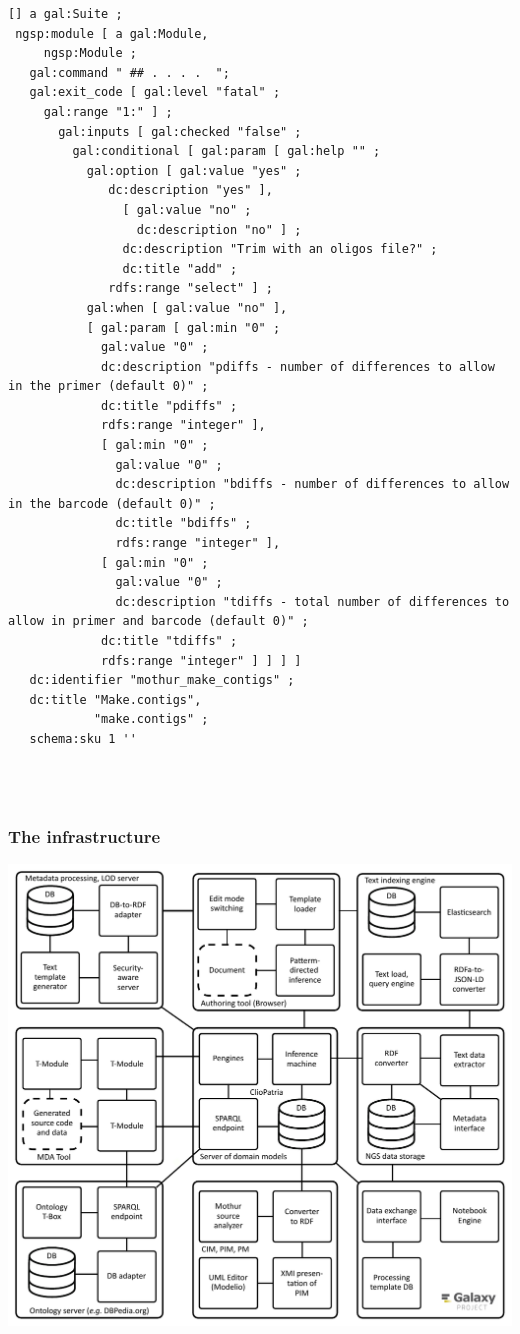 \documentclass[10pt]{beamer}
\begin{document}
\begin{frame}[fragile]
\begin{columns}[T]
\begin{column}{0.5\linewidth}
\begin{verbatim}
[] a gal:Suite ;
 ngsp:module [ a gal:Module,
     ngsp:Module ;
   gal:command " ## . . . .  ";
   gal:exit_code [ gal:level "fatal" ;
     gal:range "1:" ] ;
       gal:inputs [ gal:checked "false" ;
         gal:conditional [ gal:param [ gal:help "" ;
           gal:option [ gal:value "yes" ;
              dc:description "yes" ],
                [ gal:value "no" ;
                  dc:description "no" ] ;
                dc:description "Trim with an oligos file?" ;
                dc:title "add" ;
              rdfs:range "select" ] ;
           gal:when [ gal:value "no" ],
           [ gal:param [ gal:min "0" ;
             gal:value "0" ;
             dc:description "pdiffs - number of differences to allow in the primer (default 0)" ;
             dc:title "pdiffs" ;
             rdfs:range "integer" ],
             [ gal:min "0" ;
               gal:value "0" ;
               dc:description "bdiffs - number of differences to allow in the barcode (default 0)" ;
               dc:title "bdiffs" ;
               rdfs:range "integer" ],
             [ gal:min "0" ;
               gal:value "0" ;
               dc:description "tdiffs - total number of differences to allow in primer and barcode (default 0)" ;
             dc:title "tdiffs" ;
             rdfs:range "integer" ] ] ] ]
   dc:identifier "mothur_make_contigs" ;
   dc:title "Make.contigs",
            "make.contigs" ;
   schema:sku 1 ''



\end{verbatim}
    \end{column}
  \end{columns}
\end{frame}

\begin{frame}
  \frametitle{The infrastructure}
  \centering
  \includegraphics[width=0.8\linewidth]{architecture-mda-lod-ext-galaxy.pdf}
\end{frame}
\end{document}
